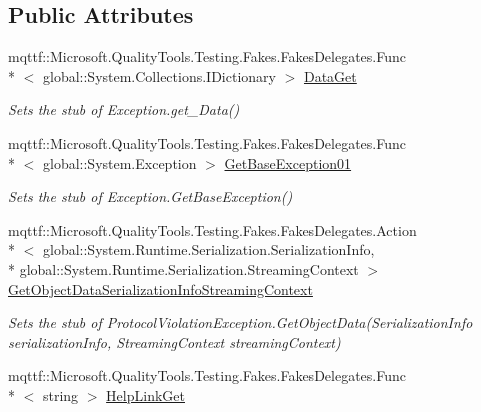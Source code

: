 \subsection*{Public Attributes}
\begin{DoxyCompactItemize}
\item 
mqttf\-::\-Microsoft.\-Quality\-Tools.\-Testing.\-Fakes.\-Fakes\-Delegates.\-Func\\*
$<$ global\-::\-System.\-Collections.\-I\-Dictionary $>$ \hyperlink{class_system_1_1_net_1_1_fakes_1_1_stub_protocol_violation_exception_a6fa5e0fd5db4fed4a95d3ec3e8975ce2}{Data\-Get}
\begin{DoxyCompactList}\small\item\em Sets the stub of Exception.\-get\-\_\-\-Data()\end{DoxyCompactList}\item 
mqttf\-::\-Microsoft.\-Quality\-Tools.\-Testing.\-Fakes.\-Fakes\-Delegates.\-Func\\*
$<$ global\-::\-System.\-Exception $>$ \hyperlink{class_system_1_1_net_1_1_fakes_1_1_stub_protocol_violation_exception_af5a0c1d5f7b8e5d9cc0eddb06f1c049a}{Get\-Base\-Exception01}
\begin{DoxyCompactList}\small\item\em Sets the stub of Exception.\-Get\-Base\-Exception()\end{DoxyCompactList}\item 
mqttf\-::\-Microsoft.\-Quality\-Tools.\-Testing.\-Fakes.\-Fakes\-Delegates.\-Action\\*
$<$ global\-::\-System.\-Runtime.\-Serialization.\-Serialization\-Info, \\*
global\-::\-System.\-Runtime.\-Serialization.\-Streaming\-Context $>$ \hyperlink{class_system_1_1_net_1_1_fakes_1_1_stub_protocol_violation_exception_aaf4a0bdfd39058972a43eb35521abe94}{Get\-Object\-Data\-Serialization\-Info\-Streaming\-Context}
\begin{DoxyCompactList}\small\item\em Sets the stub of Protocol\-Violation\-Exception.\-Get\-Object\-Data(\-Serialization\-Info serialization\-Info, Streaming\-Context streaming\-Context)\end{DoxyCompactList}\item 
mqttf\-::\-Microsoft.\-Quality\-Tools.\-Testing.\-Fakes.\-Fakes\-Delegates.\-Func\\*
$<$ string $>$ \hyperlink{class_system_1_1_net_1_1_fakes_1_1_stub_protocol_violation_exception_a0b78da680e11b2d4b18ed505707a6607}{Help\-Link\-Get}

\end{DoxyCompactItemize}
